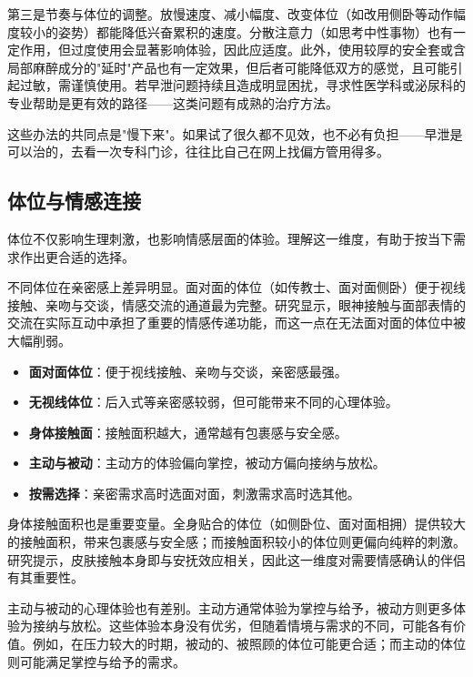 \documentclass[12pt,UTF8]{ctexbook}
\newcommand{\keyword}[1]{\textbf{#1}}
\begin{document}
第三是节奏与体位的调整。放慢速度、减小幅度、改变体位（如改用侧卧等动作幅度较小的姿势）都能降低兴奋累积的速度。分散注意力（如思考中性事物）也有一定作用，但过度使用会显著影响体验，因此应适度。此外，使用较厚的安全套或含局部麻醉成分的"延时"产品也有一定效果，但后者可能降低双方的感觉，且可能引起过敏，需谨慎使用。若早泄问题持续且造成明显困扰，寻求性医学科或泌尿科的专业帮助是更有效的路径——这类问题有成熟的治疗方法。

\begin{tcolorbox}[colback=pink!5!white,colframe=red!50!black,title=贴心小叮咛]
这些办法的共同点是"慢下来"。如果试了很久都不见效，也不必有负担——早泄是可以治的，去看一次专科门诊，往往比自己在网上找偏方管用得多。
\end{tcolorbox}
\subsection{体位与情感连接}

体位不仅影响生理刺激，也影响情感层面的体验。理解这一维度，有助于按当下需求作出更合适的选择。

不同体位在亲密感上差异明显。面对面的体位（如传教士、面对面侧卧）便于视线接触、亲吻与交谈，情感交流的通道最为完整。研究显示，眼神接触与面部表情的交流在实际互动中承担了重要的情感传递功能，而这一点在无法面对面的体位中被大幅削弱。

\begin{itemize}
  \item \keyword{面对面体位}：便于视线接触、亲吻与交谈，亲密感最强。
  \item \keyword{无视线体位}：后入式等亲密感较弱，但可能带来不同的心理体验。
  \item \keyword{身体接触面}：接触面积越大，通常越有包裹感与安全感。
  \item \keyword{主动与被动}：主动方的体验偏向掌控，被动方偏向接纳与放松。
  \item \keyword{按需选择}：亲密需求高时选面对面，刺激需求高时选其他。
\end{itemize}

身体接触面积也是重要变量。全身贴合的体位（如侧卧位、面对面相拥）提供较大的接触面积，带来包裹感与安全感；而接触面积较小的体位则更偏向纯粹的刺激。研究提示，皮肤接触本身即与安抚效应相关，因此这一维度对需要情感确认的伴侣有其重要性。

主动与被动的心理体验也有差别。主动方通常体验为掌控与给予，被动方则更多体验为接纳与放松。这些体验本身没有优劣，但随着情境与需求的不同，可能各有价值。例如，在压力较大的时期，被动的、被照顾的体位可能更合适；而主动的体位则可能满足掌控与给予的需求。
\end{document}
